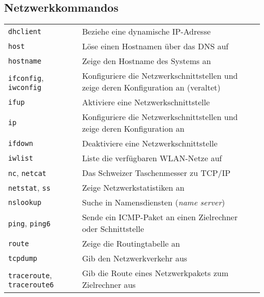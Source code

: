 \documentclass[10pt,a4paper]{article}
\begin{document}
\begin{multicols}{2}

\section{Netzwerkkommandos}
\begin{tabular}{ p{2.5cm} p{8.5cm} }
  \hline
  \texttt{dhclient} & Beziehe eine dynamische IP-Adresse \\
  \rowcolor{Gray}
  \texttt{host} & Löse einen Hostnamen über das DNS auf \\
  \texttt{hostname} & Zeige den Hostname des Systems an \\
  \rowcolor{Gray}
  \texttt{ifconfig}, \texttt{iwconfig} & Konfiguriere die Netzwerkschnittstellen und zeige deren Konfiguration an (veraltet)\\
  \texttt{ifup} & Aktiviere eine Netzwerkschnittstelle\\
  \rowcolor{Gray}
  \texttt{ip} & Konfiguriere die Netzwerkschnittstellen und zeige deren Konfiguration an \\
  \texttt{ifdown} & Deaktiviere eine Netzwerkschnittstelle \\
  \rowcolor{Gray}
  \texttt{iwlist} & Liste die verfügbaren WLAN-Netze auf\\
  \texttt{nc}, \texttt{netcat} & Das Schweizer Taschenmesser zu TCP/IP \\
  \rowcolor{Gray}
  \texttt{netstat}, \texttt{ss} & Zeige Netzwerkstatistiken an \\
  \texttt{nslookup} & Suche in Namensdiensten (\textit{name server}) \\
  \rowcolor{Gray}
  \texttt{ping}, \texttt{ping6} & Sende ein ICMP-Paket an einen Zielrechner oder Schnittstelle \\
  \texttt{route} & Zeige die Routingtabelle an \\
  \rowcolor{Gray}
  \texttt{tcpdump} & Gib den Netzwerkverkehr aus \\
  \texttt{traceroute}, \texttt{traceroute6} & Gib die Route eines Netzwerkpakets zum Zielrechner aus \\
  \hline
\end{tabular}

\hfill


\end{multicols}
\end{document}
